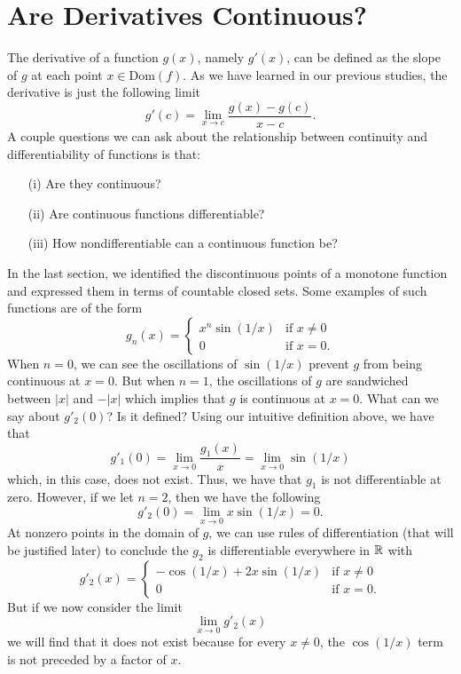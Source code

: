 

\section{Are Derivatives Continuous?}

The derivative of a function \( g(x)  \), namely \( g'(x)  \), can be defined as the slope of \( g  \) at each point \( x \in \text{Dom}(f)  \). As we have learned in our previous studies, the derivative is just the following limit
\[  g'(c) = \lim_{ x \to c } \frac{ g(x) - g(c)  }{ x - c  }.\]
A couple questions we can ask about the relationship between continuity and differentiability of functions is that: 
\begin{enumerate}
    \item[(i)] Are they continuous? 
    \item[(ii)] Are continuous functions differentiable? 
    \item[(iii)] How nondifferentiable can a continuous function be? 
\end{enumerate}
In the last section, we identified the discontinuous points of a monotone function and expressed them in terms of countable closed sets. Some examples of such functions are of the form 
\[  g_n(x) = 
\begin{cases}
    x^n \sin(1/x) &\text{if } x \neq 0 \\ 
    0 &\text{if } x = 0.
\end{cases} \]
When \( n = 0  \), we can see the oscillations of \( \sin(1/x)  \) prevent \( g  \) from being continuous at \( x = 0  \). But when \( n = 1  \), the oscillations of \( g  \) are sandwiched between \( | x  |   \) and \( - |  x  |  \) which implies that \( g  \) is continuous at \( x = 0  \). What can we say about \( g'_2(0) \)? Is it defined? Using our intuitive definition above, we have that 
\[ g'_1(0) = \lim_{ x \to 0 } \frac{ g_1(x)  }{ x  } = \lim_{ x \to 0 } \sin( 1 / x ) \] which, in this case, does not exist. Thus, we have that \( g_1  \) is not differentiable at zero.
However, if we let \( n = 2  \), then we have the following 
\[  g'_2(0) = \lim_{ x \to 0 } x \sin (1/x) = 0. \]
At nonzero points in the domain of \( g  \), we can use rules of differentiation (that will be justified later) to conclude the \( g_2  \) is differentiable everywhere in \( \mathbb{R}  \) with 
\[  g'_2(x) = 
\begin{cases}
    - \cos(1/x) + 2x \sin (1/x) &\text{if } x \neq 0 \\
    0 &\text{if } x = 0.
\end{cases} \]
But if we now consider the limit 
\[ \lim_{ x \to 0  } g'_2(x)   \]
we will find that it does not exist because for every \( x \neq 0  \), the \( \cos (1/x ) \) term is not preceded by a factor of \( x  \).

